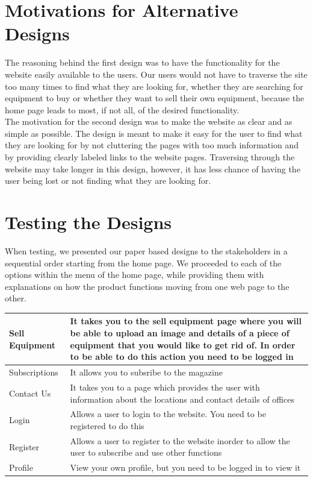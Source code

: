 \documentclass[11pt]{article}
\begin{document}
\newpage

\section{Motivations for Alternative Designs}
	The reasoning behind the first design was to have the functionality for the website easily available to the users. Our users would not have to traverse the site too many times to find what they are looking for, whether they are searching for equipment to buy or whether they want to sell their own equipment, because the home page leads to most, if not all, of the desired functionality. \\
	
	The motivation for the second design was to make the website as clear and as simple as possible. The design is meant to make it easy for the user to find what they are looking for by not cluttering the pages with too much information and by providing clearly labeled links to the website pages. Traversing through the website may take longer in this design, however, it has less chance of having the user being lost or not finding what they are looking for.

\section{Testing the Designs}
	When testing, we presented our paper based designs to the stakeholders in a sequential order starting from the home page. We proceeded to each of the options within the menu of the home page, while providing them with explanations on how the product functions moving from one web page to the other. 
	
	\begin{center}
		\begin{tabular}{ |p{3cm}||p{10cm}| } 
			\hline
			Sell Equipment &  It takes you to the sell equipment page where you	 will be able to upload an image and details of a piece of equipment that you would like to get rid of. In order to be able to do this  action you need to be logged in \\ 
			\hline
			Subscriptions &  It allows you to subsribe to the magazine\\ 
			\hline
			Contact Us & It takes you to a page which provides the user with information about the locations and contact details of offices \\ 
			\hline
			Login & Allows a user to login to the website. You need to be registered to do this \\ 
			\hline
			Register & Allows a user to register to the website inorder to allow the user to subscribe and use other functions \\ 
			\hline
			Profile & View your own profile, but you need to be logged in to view it \\
			\hline
		\end{tabular} 
	\end{center}
	
\end{document}
